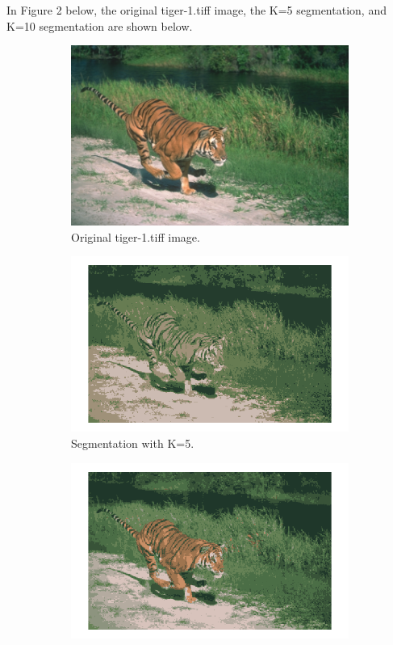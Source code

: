 \documentclass[12pt]{report}
\begin{document}
\begin{enumerate}
  \newpage
  In Figure 2 below, the original tiger-1.tiff image, the K=5 segmentation, and
  K=10 segmentation are shown below.

  \begin{figure}[H]
    \centering
    \begin{subfigure}{0.48\linewidth}
      \includegraphics[width=\linewidth]{tiger-1.png}
      \caption{Original tiger-1.tiff image.}
    \end{subfigure}
    \begin{subfigure}{0.55\linewidth}
      \includegraphics[width=\linewidth]{2a5.png}
      \caption{Segmentation with K=5.}
    \end{subfigure}
    \begin{subfigure}{0.55\linewidth}
      \includegraphics[width=\linewidth]{2a10.png}

\end{subfigure}
\end{figure}
\end{enumerate}
\end{document}
